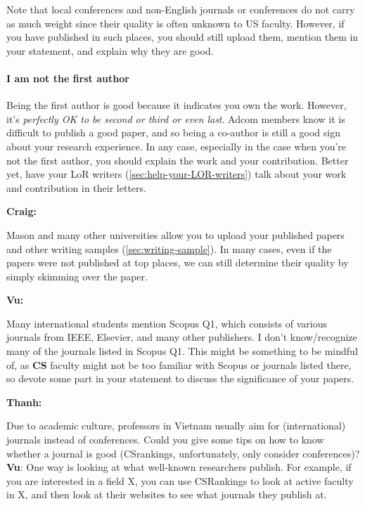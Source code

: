\documentclass[oneside,11pt,dvipsnames]{book}
\newenvironment{commentbox}[1][]{
  \small
  \begin{mybox}
    {\small \textbf{#1}}
  }{
  \end{mybox}
}
\begin{document}
Note that local conferences and non-English journals or conferences do
not carry as much weight since their quality is often unknown to US faculty. However, if you have published in such places, you should still upload them, mention them in your statement, and explain why they are good.


\paragraph{I am not the first author} Being the first author is good because it indicates you own the work. However, it's \emph{perfectly OK to be second or third or even last}.  Adcom members know it is difficult to publish a good paper, and so being a co-author is still a good sign about your research experience. In any case, especially in the case when you're not the first author, you should explain the work and your contribution.  Better yet, have your LoR writers (\autoref{sec:help-your-LOR-writers}) talk about your work and contribution in their letters.

\begin{commentbox}[Craig:]
  Mason and many other universities allow you to upload your published papers and other writing samples (\autoref{sec:writing-sample}). In many cases, even if the papers were not published at top places, we can still determine their quality by simply skimming over the paper.
\end{commentbox}



\begin{commentbox}[Vu:]
    Many international students mention Scopus Q1, which consists of various journals from IEEE, Elsevier, and many other publishers.  I don't know/recognize many of the journals listed in Scopus Q1. This might be something to be mindful of, as \textbf{CS} faculty might not be too familiar with Scopus or journals listed there, so devote some part in your statement to discuss the significance of your papers.
  \end{commentbox}
  
  \begin{commentbox}[Thanh:]
      Due to academic culture, professors in Vietnam usually aim for (international) journals instead of conferences. Could you give some tips on how to know whether a journal is good (CSrankings, unfortunately, only consider conferences)?
      \tcblower
      \textbf{Vu}: One way is looking at what well-known researchers publish. For example, if you are interested in a field X, you can use CSRankings to look at active faculty in X, and then look at their websites to see what journals they publish at.
  \end{commentbox}
\end{document}
